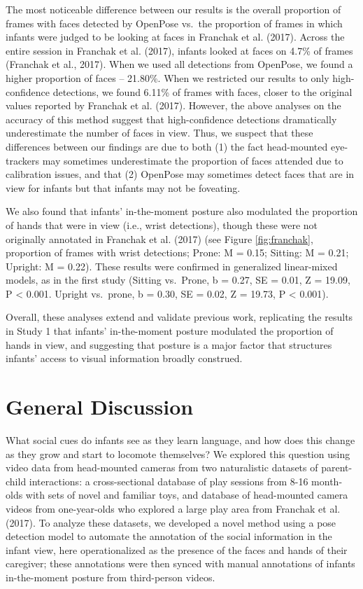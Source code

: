 \documentclass[english,man]{apa6}
\begin{document}
The most noticeable difference between our results is the overall
proportion of frames with faces detected by OpenPose vs.~the proportion
of frames in which infants were judged to be looking at faces in
Franchak et al. (2017). Across the entire session in Franchak et al.
(2017), infants looked at faces on 4.7\% of frames (Franchak et al.,
2017). When we used all detections from OpenPose, we found a higher
proportion of faces -- 21.80\%. When we restricted our results to only
high-confidence detections, we found 6.11\% of frames with faces, closer
to the original values reported by Franchak et al. (2017). However, the
above analyses on the accuracy of this method suggest that
high-confidence detections dramatically underestimate the number of
faces in view. Thus, we suspect that these differences between our
findings are due to both (1) the fact head-mounted eye-trackers may
sometimes underestimate the proportion of faces attended due to
calibration issues, and that (2) OpenPose may sometimes detect faces
that are in view for infants but that infants may not be foveating.

We also found that infants' in-the-moment posture also modulated the
proportion of hands that were in view (i.e., wrist detections), though
these were not originally annotated in Franchak et al. (2017) (see
Figure \ref{fig:franchak}, proportion of frames with wrist detections;
Prone: M = 0.15; Sitting: M = 0.21; Upright: M = 0.22). These results
were confirmed in generalized linear-mixed models, as in the first study
(Sitting vs.~Prone, b = 0.27, SE = 0.01, Z = 19.09, P \textless{} 0.001.
Upright vs.~prone, b = 0.30, SE = 0.02, Z = 19.73, P \textless{} 0.001).

Overall, these analyses extend and validate previous work, replicating
the results in Study 1 that infants' in-the-moment posture modulated the
proportion of hands in view, and suggesting that posture is a major
factor that structures infants' access to visual information broadly
construed.

\section{General Discussion}\label{general-discussion}

What social cues do infants see as they learn language, and how does
this change as they grow and start to locomote themselves? We explored
this question using video data from head-mounted cameras from two
naturalistic datasets of parent-child interactions: a cross-sectional
database of play sessions from 8-16 month-olds with sets of novel and
familiar toys, and database of head-mounted camera videos from
one-year-olds who explored a large play area from Franchak et al.
(2017). To analyze these datasets, we developed a novel method using a
pose detection model to automate the annotation of the social
information in the infant view, here operationalized as the presence of
the faces and hands of their caregiver; these annotations were then
synced with manual annotations of infants in-the-moment posture from
third-person videos.
\end{document}
